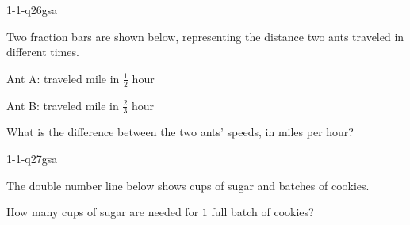 \begin{practiceQuestion}{1-1-q26}{gsa}
\begin{questionText}
Two fraction bars are shown below, representing the distance two ants traveled in different times.

\begin{center}
Ant A: traveled  mile in $\frac{1}{2}$ hour

\vspace{0.5em}
Ant B: traveled  mile in $\frac{2}{3}$ hour
\end{center}

What is the difference between the two ants' speeds, in miles per hour?
\end{questionText}
\end{practiceQuestion}

\begin{practiceQuestion}{1-1-q27}{gsa}
\begin{questionText}
The double number line below shows cups of sugar and batches of cookies.

\begin{center}
\end{center}

How many cups of sugar are needed for $1$ full batch of cookies?
\end{questionText}
\end{practiceQuestion}

